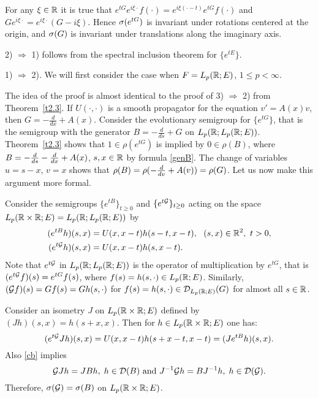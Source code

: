 \begin{pf}
For any $\xi \in {\Bbb{R}}$ it is
true that $e^{tG} e^{i\xi\cdot} f(\cdot) =e^{i\xi
(\cdot -t)}e^{tG} f(\cdot)$ and $Ge^{i\xi \cdot} =e^{i\xi \cdot}
(G-i\xi)$.  Hence $\sigma (e^{tG})$ is invariant under rotations
centered at the origin, and $\sigma (G)$ is invariant under translations along
the imaginary axis.

2) $\Rightarrow$ 1) follows from the spectral inclusion theorem
for $\{e^{tE}\}$.

1) $\Rightarrow$ 2). We will first consider the case when
$F=L_p({\Bbb{R}};E)$, $1\leq p <\infty$.

The idea of the proof is almost identical to the
proof of 3) $\Rightarrow$ 2) from Theorem~\ref{t2.3}.
If $U(\cdot, \cdot)$ is a smooth propagator for the equation
$v'=A(x)v$, then $G=-\frac{d}{dx}+A(x)$. Consider
the evolutionary semigroup for
$\{e^{tG}\}$,
that is the semigroup with the generator
$B=-\frac{d}{ds}+G$ on $L_p({\Bbb{R}}; L_p({\Bbb{R}}; E))$.
Theorem~\ref{t2.3} shows that
$1\in\rho(e^{tG})$ is implied by
$0\in\rho(B)$, where
$B = -{d\over ds} - {d\over dx} + A(x)$, $s,x\in {\Bbb{R}}$
by formula \eqref{genB}.
The change of variables $u = s-x$,
$v = x$ shows that $\rho(B) = \rho (-{d\over dv} + A(v))
= \rho(G)$.  Let us now
make this argument more formal.

Consider the semigroups $\{e^{tB}\}_{t\geq 0}$ and $\{e^{t{\cal{G}}}\}_{t\geq 0}$
acting on the space $L_p ({\Bbb{R}} \times {\Bbb{R}}; E) =L_p ({\Bbb{R}};
L_p ({\Bbb{R}};E))$ by
\begin{align*}
(e^{tB}h) (s,x) &=U(x,x-t) h(s-t, x-t), ~~(s,x) \in{\Bbb{R}}^2, ~t>0,\\
(e^{t{\cal{G}}} h)(s,x) &=U(x,x-t) h(s,x-t).
\end{align*}
Note that $e^{t{\cal{G}}}$ in $L_p({\Bbb{R}}; L_p({\Bbb{R}}; E))$
is the operator of multiplication by $e^{tG}$, that is
$(e^{t{\cal{G}}}f)(s)=e^{tG}f(s)$, where $f(s)=h(s, \cdot )\in L_p({\Bbb{R}}; E)$.
Similarly, $({\cal{G}} f)(s)=Gf(s)=Gh(s, \cdot )$ for
$f(s) = h(s, \cdot )\in {\cal{D}}_{L_p({\Bbb{R}}; E)}(G)$
for almost all $s\in{\Bbb{R}}$.

Consider an isometry $J$ on $L_p ({\Bbb{R}}\times {\Bbb{R}};E)$ defined by
$(Jh)(s,x)=h(s+x, x)$.  Then for $h\in L_p ({\Bbb{R}}\times {\Bbb{R}};E)$
one has:
\begin{equation}
(e^{t\calG} Jh) (s,x) =U(x,x-t) h(s+x-t, x-t)=(Je^{tB}h)(s,x).
\lb{cb}
\end{equation}
Also \eqref{cb} implies
$$
{\cal{G}} Jh =JBh, \; h\in{\cal{D}}(B)
\mbox{ and } J^{-1} {\cal{G}} h =BJ^{-1} h, \;
h\in{\cal{D}} ({\cal{G}}).
$$
Therefore, $\sigma ({\cal{G}}) =\sigma (B)$ on $L_p({\Bbb{R}} \times {\Bbb{R}}; E)$.


\end{pf}
